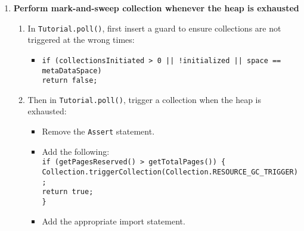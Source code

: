 \documentclass[textsize=14pt]{article}
\newcommand{\code}[1]{\texttt{#1}}
\begin{document}
\begin{itemize}
\begin{enumerate}
    \item \textbf{Perform mark-and-sweep collection whenever the heap is exhausted}
    \begin{enumerate}

        \item In \code{Tutorial.poll()}, first insert a guard to
        ensure collections are not triggered at the wrong times:
        \begin{itemize}
            \item \code{if (collectionsInitiated > 0 || !initialized || space ==
            metaDataSpace) \\ return false;}
        \end{itemize}

        \item Then in \code{Tutorial.poll()}, trigger a collection when the heap is exhausted:
        \begin{itemize}
            \item Remove the \code{Assert} statement.
            \item Add the following: \\
                \code{if (getPagesReserved() > getTotalPages()) \{ \\
                   Collection.triggerCollection(Collection.RESOURCE\_GC\_TRIGGER);
                   \\
                   return true; \\ \} }
            \item Add the appropriate import statement.
        \end{itemize}


\end{enumerate}
\end{enumerate}
\end{itemize}
\end{document}
